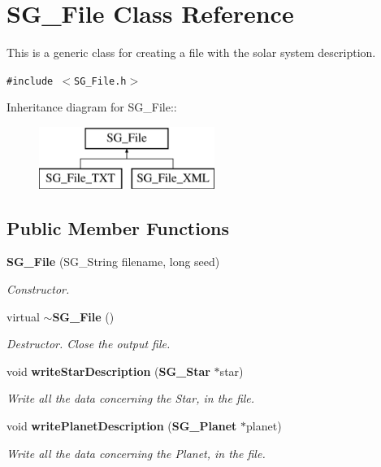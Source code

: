 \section{SG\_\-File Class Reference}
\label{class_s_g___file}
This is a generic class for creating a file with the solar system description.  


{\tt \#include $<$SG\_\-File.h$>$}

Inheritance diagram for SG\_\-File::\begin{figure}[H]
\begin{center}
\leavevmode
\includegraphics[height=2cm]{class_s_g___file}
\end{center}
\end{figure}
\subsection*{Public Member Functions}
\begin{CompactItemize}
\item 
{\bf SG\_\-File} (SG\_\-String filename, long seed)\label{class_s_g___file_a0}

\begin{CompactList}\small\item\em Constructor. \item\end{CompactList}\item 
virtual {\bf $\sim$SG\_\-File} ()\label{class_s_g___file_a1}

\begin{CompactList}\small\item\em Destructor. Close the output file. \item\end{CompactList}\item 
void {\bf write\-Star\-Description} ({\bf SG\_\-Star} $\ast$star)\label{class_s_g___file_a2}

\begin{CompactList}\small\item\em Write all the data concerning the Star, in the file. \item\end{CompactList}\item 
void {\bf write\-Planet\-Description} ({\bf SG\_\-Planet} $\ast$planet)\label{class_s_g___file_a3}

\begin{CompactList}\small\item\em Write all the data concerning the Planet, in the file. \item\end{CompactList}\end{CompactItemize}
